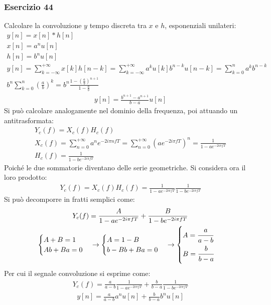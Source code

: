 \documentclass{article}
\begin{document}
\subsubsection*{Esercizio 44}

Calcolare la convoluzione $y$ tempo discreta tra $x$ e $h$, esponenziali unilateri: 
\begin{gather*}
    y[n]=x[n]*h[n]\\
    x[n]=a^nu[n]\\
    h[n]=b^nu[n]\\
    y[n]=\displaystyle\sum_{k=-\infty}^{+\infty}x[k]h[n-k]=\sum_{k=-\infty}^{+\infty}a^ku[k]b^{n-k}u[n-k]=\sum_{k=0}^na^kb^{n-k}\\
    \displaystyle b^n\sum_{k=0}^n\left(\frac{a}{b}\right)^k=b^n\frac{1-\left(\frac{a}{b}\right)^{n+1}}{1-\frac{a}{b}}
\end{gather*}
\begin{gather}
    y[n]=\displaystyle\frac{b^{n+1}-a^{n+1}}{b-a}u[n]
\end{gather}
Si può calcolare analogamente nel dominio della frequenza, poi attuando un antitrasformata: 
\begin{gather*}
    Y_c(f)=X_c(f)H_c(f)\\
    X_c(f)=\displaystyle\sum_{n=0}^{+\infty}a^ne^{-2i\pi nfT}=\sum_{n=0}^{+\infty}\left(ae^{-2i\pi fT}\right)^n=\frac{1}{1-ae^{-2i\pi fT}}\\
    H_c(f)=\displaystyle\frac{1}{1-be^{-2i\pi fT}}
\end{gather*}
Poiché le due sommatorie diventano delle serie geometriche. Si considera ora il loro prodotto:
\begin{gather*}
    Y_c(f)=X_c(f)H_c(f)=\displaystyle\frac{1}{1-ae^{-2i\pi fT}}\frac{1}{1-be^{-2i\pi fT}}
\end{gather*}
Si può decomporre in fratti semplici come:
\begin{gather*}
    Y_c(f)=\displaystyle\frac{A}{1-ae^{-2i\pi fT}}+\frac{B}{1-be^{-2i\pi fT}}\\
    \begin{cases}
        A+B=1\\
        Ab+Ba=0
    \end{cases}\to
    \begin{cases}
        A=1-B\\
        b-Bb+Ba=0
    \end{cases}\to\begin{cases}
        A=\displaystyle\frac{\strut a}{\strut a-b}\\
        B=\displaystyle\frac{\strut b}{\strut b-a}
    \end{cases}
\end{gather*}
Per cui il segnale convoluzione si esprime come:
\begin{gather*}
    Y_c(f)=\displaystyle\frac{a}{a-b}\frac{1}{1-ae^{-2i\pi fT}}+\frac{b}{b-a}\frac{1}{1-be^{-2i\pi fT}}
\end{gather*}
\begin{gather}
    y[n]=\displaystyle\frac{a}{a-b}a^nu[n]+\displaystyle\frac{b}{b-a}b^nu[n]
\end{gather}
\end{document}
